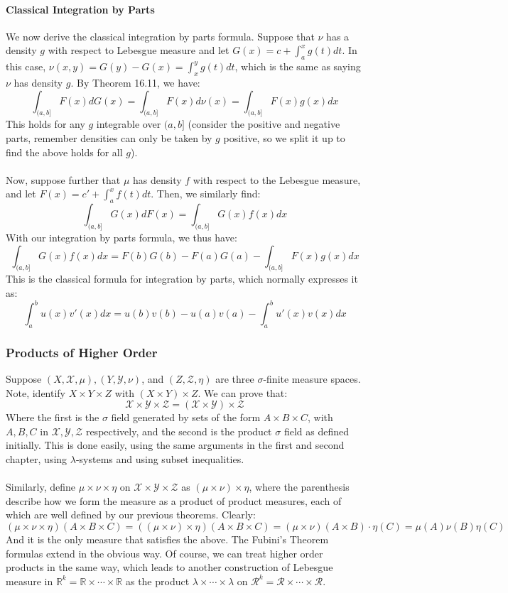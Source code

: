 \documentclass[12pt,a4paper]{article}
\newcommand{\1}[1]{\mathbbm{1}\left\{ #1 \right\}}
\newcommand{\R}{\mathbb{R}}
\newcommand{\rcal}{\mathcal{R}}
\newcommand{\xcal}{\mathcal{X}}
\newcommand{\ycal}{\mathcal{Y}}
\newcommand{\zcal}{\mathcal{Z}}
\begin{document}
\paragraph{Classical Integration by Parts} We now derive the classical integration by parts formula. Suppose that $\nu$ has a density $g$ with respect to Lebesgue measure and let $G(x) = c + \int_a^x g(t) dt$. In this case, $\nu(x,y) = G(y) - G(x) = \int_x^y g(t) dt$, which is the same as saying $\nu$ has density $g$. By Theorem 16.11, we have:
$$
	\int_{(a,b]} F(x) dG(x) = \int_{(a,b]} F(x) d\nu(x) = \int_{(a,b]} F(x)g(x) dx
$$
This holds for any $g$ integrable over $(a,b]$ (consider the positive and negative parts, remember densities can only be taken by $g$ positive, so we split it up to find the above holds for all $g$).
\\\\
Now, suppose further that $\mu$ has density $f$ with respect to the Lebesgue measure, and let $F(x) = c' + \int_a^x f(t) dt$. Then, we similarly find:
$$
	\int_{(a,b]} G(x) dF(x) = \int_{(a,b]} G(x) f(x) dx
$$
With our integration by parts formula, we thus have:
$$
	\int_{(a,b]} G(x) f(x) dx =
	F(b)G(b) - F(a)G(a) - \int_{(a,b]} F(x)g(x) dx
$$
This is the classical formula for integration by parts, which normally expresses it as:
$$
	\int_a^b u(x) v'(x) dx =
	u(b)v(b) - u(a)v(a) - \int_a^b u'(x) v(x) dx
$$

\subsubsection{Products of Higher Order} Suppose $(X, \xcal, \mu), (Y, \ycal, \nu)$, and $(Z, \zcal, \eta)$ are three $\sigma$-finite measure spaces. Note, identify $X \times Y \times Z$ with $(X \times Y) \times Z$. We can prove that:
$$
	\xcal \times \ycal \times \zcal = (\xcal \times \ycal) \times \zcal
$$
Where the first is the $\sigma$ field generated by sets of the form $A \times B \times C$, with $A, B, C$ in $\xcal, \ycal, \zcal$ respectively, and the second is the product $\sigma$ field as defined initially. This is done easily, using the same arguments in the first and second chapter, using $\lambda$-systems and using subset inequalities.
\\\\
Similarly, define $\mu \times \nu \times \eta$ on $\xcal \times \ycal \times \zcal$ as $(\mu \times \nu) \times \eta$, where the parenthesis describe how we form the measure as a product of product measures, each of which are well defined by our previous theorems. Clearly:
$$
	(\mu \times \nu \times \eta)(A \times B \times C) =
	((\mu \times \nu) \times \eta)(A \times B \times C) =
	(\mu \times \nu)(A \times B) \cdot \eta(C) =
	\mu(A)\nu(B)\eta(C)
$$
And it is the only measure that satisfies the above. The Fubini's Theorem formulas extend in the obvious way. Of course, we can treat higher order products in the same way, which leads to another construction of Lebesgue measure in $\R^k = \R \times \cdots \times \R$ as the product $\lambda \times \cdots \times \lambda$ on $\rcal^k = \rcal \times \cdots \times \rcal$.
\end{document}
